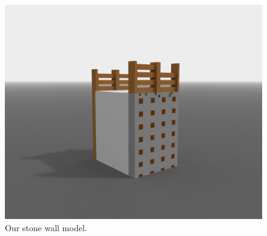 \begin{figure}[ht]
	\centering
	\includegraphics[width=\linewidth]{pictures/stone_wall.png}
	\caption{Our stone wall model.}
\end{figure}
